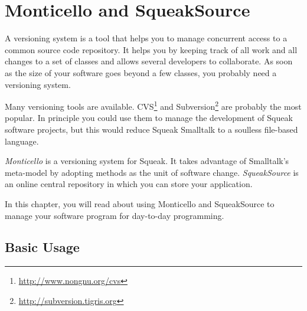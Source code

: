 \documentclass[a4paper,10pt,twoside]{book}
\begin{document}
	\sloppy
\fi

\newcommand{\figlabel}[1]{\label{fig:#1}}
\newcommand{\seclabel}[1]{\label{sec:#1}}

\chapter{Monticello and SqueakSource}


A versioning system is a tool that helps you to manage concurrent access to a common source code repository. It helps you by keeping track of all work and all changes to a set of classes and allows several developers to collaborate. As soon as the size of your software goes beyond a few classes, you probably need a versioning system.

Many versioning tools are available. CVS\footnote{\url{http://www.nongnu.org/cvs}} and Subversion\footnote{\url{http://subversion.tigris.org}} are probably the most popular.
In principle you could use them to manage the development of Squeak software projects, but this would reduce Squeak Smalltalk to a soulless file-based language. 

\emph{Monticello} is a versioning system for Squeak. It takes advantage of Smalltalk's meta-model by adopting methods as the unit of software change. \emph{SqueakSource} is an online central repository in which you can store your application.

In this chapter, you will read about using Monticello and SqueakSource to manage your software program for day-to-day programming.



\section{Basic Usage}
\end{document}
